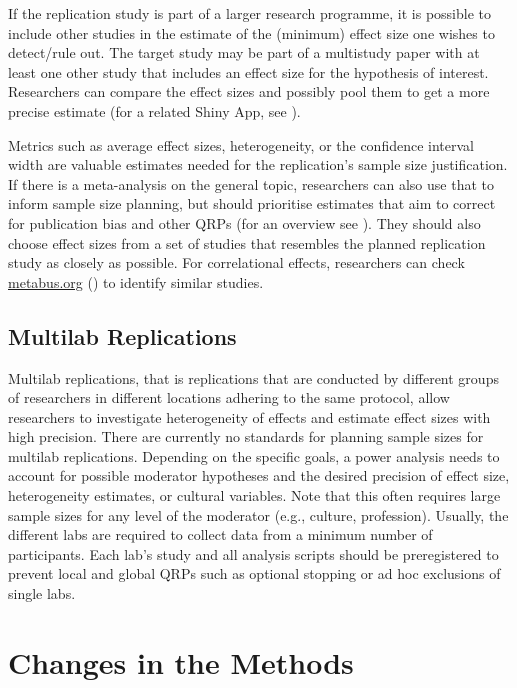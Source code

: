 \documentclass[
  letterpaper,
  DIV=11,
  openany,
  fontsize=12pt,
  parskip=half,
  headings=big,
  numbers=noenddot,
  titlepage=false]{scrreprt}
\begin{document}
If the replication study is part of a larger research programme, it is
possible to include other studies in the estimate of the (minimum)
effect size one wishes to detect/rule out. The target study may be part
of a multistudy paper with at least one other study that includes an
effect size for the hypothesis of interest. Researchers can compare the
effect sizes and possibly pool them to get a more precise estimate (for
a related Shiny App, see ).

Metrics such as average effect sizes, heterogeneity, or the confidence
interval width are valuable estimates needed for the replication's
sample size justification. If there is a meta-analysis on the general
topic, researchers can also use that to inform sample size planning, but
should prioritise estimates that aim to correct for publication bias and
other QRPs (for an overview see ). They should also choose effect sizes from a set of studies that
resembles the planned replication study as closely as possible. For
correlational effects, researchers can check \url{metabus.org}
() to
identify similar studies.

\subsection{Multilab Replications}\label{multilab-replications}

Multilab replications, that is replications that are conducted by
different groups of researchers in different locations adhering to the
same protocol, allow researchers to investigate heterogeneity of effects
and estimate effect sizes with high precision. There are currently no
standards for planning sample sizes for multilab replications. Depending
on the specific goals, a power analysis needs to account for possible
moderator hypotheses and the desired precision of effect size,
heterogeneity estimates, or cultural variables. Note that this often
requires large sample sizes for any level of the moderator (e.g.,
culture, profession). Usually, the different labs are required to
collect data from a minimum number of participants. Each lab's study and
all analysis scripts should be preregistered to prevent local and global
QRPs such as optional stopping or ad hoc exclusions of single labs.

\section{Changes in the Methods}\label{changes-in-the-methods}
\end{document}
